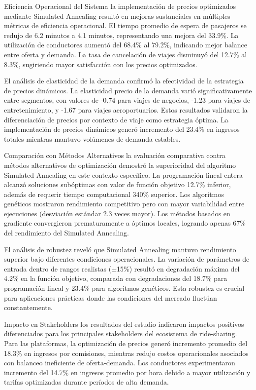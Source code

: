 \documentclass[12pt,a4paper,twocolumn]{article}
\begin{document}
Eficiencia Operacional del Sistema la implementación de precios optimizados mediante Simulated Annealing resultó en mejoras sustanciales en múltiples métricas de eficiencia operacional. El tiempo promedio de espera de pasajeros se redujo de 6.2 minutos a 4.1 minutos, representando una mejora del 33.9\%. La utilización de conductores aumentó del 68.4\% al 79.2\%, indicando mejor balance entre oferta y demanda. La tasa de cancelación de viajes disminuyó del 12.7\% al 8.3\%, sugiriendo mayor satisfacción con los precios optimizados.

El análisis de elasticidad de la demanda confirmó la efectividad de la estrategia de precios dinámicos. La elasticidad precio de la demanda varió significativamente entre segmentos, con valores de -0.74 para viajes de negocios, -1.23 para viajes de entretenimiento, y -1.67 para viajes aeroportuarios. Estos resultados validaron la diferenciación de precios por contexto de viaje como estrategia óptima. La implementación de precios dinámicos generó incremento del 23.4\% en ingresos totales mientras mantuvo volúmenes de demanda estables.

Comparación con Métodos Alternativos la evaluación comparativa contra métodos alternativos de optimización demostró la superioridad del algoritmo Simulated Annealing en este contexto específico. La programación lineal entera alcanzó soluciones subóptimas con valor de función objetivo 12.7\% inferior, además de requerir tiempo computacional 340\% superior. Los algoritmos genéticos mostraron rendimiento competitivo pero con mayor variabilidad entre ejecuciones (desviación estándar 2.3 veces mayor). Los métodos basados en gradiente convergieron prematuramente a óptimos locales, logrando apenas 67\% del rendimiento del Simulated Annealing.

El análisis de robustez reveló que Simulated Annealing mantuvo rendimiento superior bajo diferentes condiciones operacionales. La variación de parámetros de entrada dentro de rangos realistas ($\pm$15\%) resultó en degradación máxima del 4.2\% en la función objetivo, comparada con degradaciones del 18.7\% para programación lineal y 23.4\% para algoritmos genéticos. Esta robustez es crucial para aplicaciones prácticas donde las condiciones del mercado fluctúan constantemente.

Impacto en Stakeholders los resultados del estudio indicaron impactos positivos diferenciados para los principales stakeholders del ecosistema de ride-sharing. Para las plataformas, la optimización de precios generó incremento promedio del 18.3\% en ingresos por comisiones, mientras redujo costos operacionales asociados con balanceo ineficiente de oferta-demanda. Los conductores experimentaron incremento del 14.7\% en ingresos promedio por hora debido a mayor utilización y tarifas optimizadas durante períodos de alta demanda.
\end{document}
